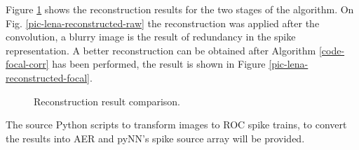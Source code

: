Figure \ref{fig-reconstruction-results} shows the reconstruction results for the two stages of the algorithm. On Fig. \ref{pic-lena-reconstructed-raw} the reconstruction was applied after the convolution, a blurry image is the result of redundancy in the spike representation. A better reconstruction can be obtained after Algorithm \ref{code-focal-corr} has been performed, the result is shown in Figure \ref{pic-lena-reconstructed-focal}.


\begin{figure}[hbt]
  \centering
  \caption{Reconstruction result comparison.}
  \label{fig-reconstruction-results}
\end{figure}

The source Python scripts to transform images to ROC spike trains, to convert the results into AER and pyNN's spike source array will be provided.